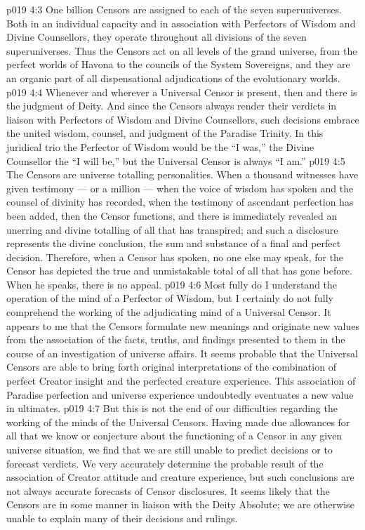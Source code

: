 \vs p019 4:3 One billion Censors are assigned to each of the seven superuniverses. Both in an individual capacity and in association with Perfectors of Wisdom and Divine Counsellors, they operate throughout all divisions of the seven superuniverses. Thus the Censors act on all levels of the grand universe, from the perfect worlds of Havona to the councils of the System Sovereigns, and they are an organic part of all dispensational adjudications of the evolutionary worlds.
\vs p019 4:4 \pc Whenever and wherever a Universal Censor is present, then and there is the judgment of Deity. And since the Censors always render their verdicts in liaison with Perfectors of Wisdom and Divine Counsellors, such decisions embrace the united wisdom, counsel, and judgment of the Paradise Trinity. In this juridical trio the Perfector of Wisdom would be the “I was,” the Divine Counsellor the “I will be,” but the Universal Censor is always “I am.”
\vs p019 4:5 \pc The Censors are universe totalling personalities. When a thousand witnesses have given testimony --- or a million --- when the voice of wisdom has spoken and the counsel of divinity has recorded, when the testimony of ascendant perfection has been added, then the Censor functions, and there is immediately revealed an unerring and divine totalling of all that has transpired; and such a disclosure represents the divine conclusion, the sum and substance of a final and perfect decision. Therefore, when a Censor has spoken, no one else may speak, for the Censor has depicted the true and unmistakable total of all that has gone before. When he speaks, there is no appeal.
\vs p019 4:6 Most fully do I understand the operation of the mind of a Perfector of Wisdom, but I certainly do not fully comprehend the working of the adjudicating mind of a Universal Censor. It appears to me that the Censors formulate new meanings and originate new values from the association of the facts, truths, and findings presented to them in the course of an investigation of universe affairs. It seems probable that the Universal Censors are able to bring forth original interpretations of the combination of perfect Creator insight and the perfected creature experience. This association of Paradise perfection and universe experience undoubtedly eventuates a new value in ultimates.
\vs p019 4:7 But this is not the end of our difficulties regarding the working of the minds of the Universal Censors. Having made due allowances for all that we know or conjecture about the functioning of a Censor in any given universe situation, we find that we are still unable to predict decisions or to forecast verdicts. We very accurately determine the probable result of the association of Creator attitude and creature experience, but such conclusions are not always accurate forecasts of Censor disclosures. It seems likely that the Censors are in some manner in liaison with the Deity Absolute; we are otherwise unable to explain many of their decisions and rulings.
